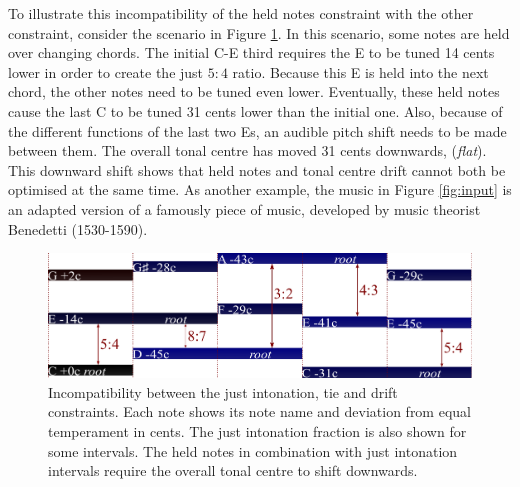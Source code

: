 \documentclass[a4paper]{article}
\begin{document}
To illustrate this incompatibility of the held notes constraint with the other constraint, consider the scenario in Figure \ref{fig:ties_vs_ji}. In this scenario, some notes are held over changing chords. The initial C-E third requires the E to be tuned 14 cents lower in order to create the just $5:4$ ratio. Because this E is held into the next chord, the other notes need to be tuned even lower. Eventually, these held notes cause the last C to be tuned 31 cents lower than the initial one. Also, because of the different functions of the last two Es, an audible pitch shift needs to be made between them. The overall tonal centre has moved 31 cents downwards, (\textit{flat}). This downward shift shows that held notes and tonal centre drift cannot both be optimised at the same time. As another example, the music in Figure \ref{fig:input} is an adapted version of a famously  piece of music, developed by music theorist Benedetti (1530-1590). \cite{devaney_study_2012}

\begin{figure}
	\centering
	\includegraphics[width=\linewidth]{Figures/ties_vs_ji.pdf}
	\caption{Incompatibility between the just intonation, tie and drift constraints. Each note shows its note name and deviation from equal temperament in cents. The just intonation fraction is also shown for some intervals. The held notes in combination with just intonation intervals require the overall tonal centre to shift downwards.}
	\label{fig:ties_vs_ji}
\end{figure}
\end{document}
